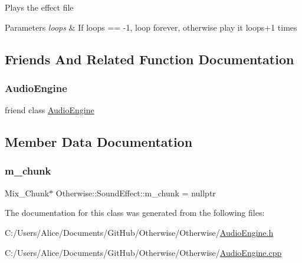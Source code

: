 Plays the effect file 
\begin{DoxyParams}{Parameters}
{\em loops} & If loops == -\/1, loop forever, otherwise play it loops+1 times \\
\hline
\end{DoxyParams}


\subsection{Friends And Related Function Documentation}
\mbox{\label{class_otherwise_1_1_sound_effect_a234a96133b0b1dbaf4181626861f7c4a}} 
\subsubsection{\texorpdfstring{Audio\+Engine}{AudioEngine}}
{\footnotesize\ttfamily friend class \hyperlink{class_otherwise_1_1_audio_engine}{Audio\+Engine}\hspace{0.3cm}{\ttfamily [friend]}}



\subsection{Member Data Documentation}
\mbox{\label{class_otherwise_1_1_sound_effect_a457a25ed12d7e211421cb40aa91a07a5}} 
\subsubsection{\texorpdfstring{m\+\_\+chunk}{m\_chunk}}
{\footnotesize\ttfamily Mix\+\_\+\+Chunk$\ast$ Otherwise\+::\+Sound\+Effect\+::m\+\_\+chunk = nullptr\hspace{0.3cm}{\ttfamily [private]}}



The documentation for this class was generated from the following files\+:\begin{DoxyCompactItemize}
\item 
C\+:/\+Users/\+Alice/\+Documents/\+Git\+Hub/\+Otherwise/\+Otherwise/\hyperlink{_audio_engine_8h}{Audio\+Engine.\+h}\item 
C\+:/\+Users/\+Alice/\+Documents/\+Git\+Hub/\+Otherwise/\+Otherwise/\hyperlink{_audio_engine_8cpp}{Audio\+Engine.\+cpp}\end{DoxyCompactItemize}
